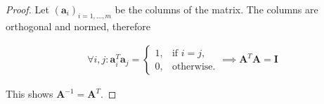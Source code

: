 \begin{proof}
	Let $(\mathbf{a}_i)_{i=1,...,m}$ be the columns of the matrix. The columns are orthogonal and normed, therefore
	
	\begin{align*}
		\forall i,j: \mathbf{a}_i^T\mathbf{a}_j = \begin{cases}
			1, & \text{if } i=j,\\
			0, & \text{otherwise.}
		\end{cases} \implies \mathbf{A}^T\mathbf{A} = \mathbf{I}
	\end{align*}
	
	This shows $\mathbf{A}^{-1} = \mathbf{A}^T$.
\end{proof}